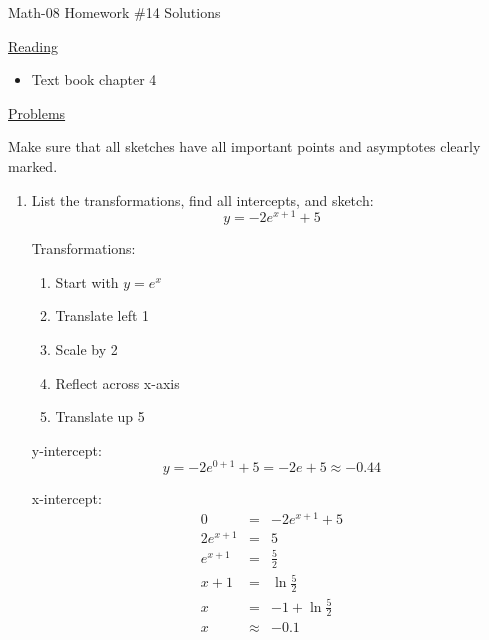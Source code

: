 \documentclass[letterpaper,12pt,fleqn]{article}
\begin{document}
\begin{center}
\Large Math-08 Homework \#14 Solutions
\end{center}

\vspace{0.5in}

\underline{Reading}

\begin{itemize}
\item Text book chapter 4
\end{itemize}

\underline{Problems}

Make sure that all sketches have all important points and asymptotes
clearly marked.

\begin{enumerate}
\item List the transformations, find all intercepts, and sketch:
  \[y=-2e^{x+1}+5\]

  Transformations:
  \begin{enumerate}[label={\arabic*)}]
  \item Start with $y=e^x$
  \item Translate left 1
  \item Scale by 2
  \item Reflect across x-axis
  \item Translate up 5
  \end{enumerate}

  y-intercept:
  \[y=-2e^{0+1}+5=-2e+5\approx-0.44\]

  x-intercept:
  \begin{eqnarray*}
    0 &=& -2e^{x+1}+5 \\
    2e^{x+1} &=& 5 \\
    e^{x+1} &=& \frac{5}{2} \\
    x+1 &=& \ln{\frac{5}{2}} \\
    x &=& -1+\ln{\frac{5}{2}} \\
    x &\approx& -0.1
  \end{eqnarray*}



\end{enumerate}
\end{document}
